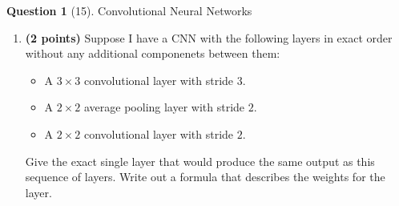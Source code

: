 \documentclass[12pt]{article}
\theoremstyle{definition}
\newtheorem{exercise}{Question}%
\begin{document}
\begin{exercise}[15]{
\label{ex:convolutional-neural-networks}
Convolutional Neural Networks
\begin{enumerate}
\item \textbf{(2 points)} Suppose I have a CNN with the following layers in exact order without any additional componenets between them:
\begin{itemize}
    \item A $3\times 3$ convolutional layer with stride $3$.
    \item A $2\times 2$ average pooling layer with stride $2$.
    \item A $2\times 2$ convolutional layer with stride $2$.
\end{itemize}
Give the exact single layer that would produce the same output as this sequence of layers. Write out a formula that describes the weights for the layer.


\end{enumerate}}
\end{exercise}
\end{document}
